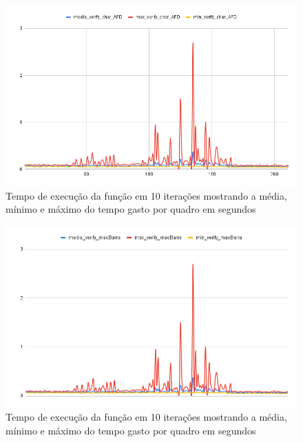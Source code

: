 \begin{figure}[H]
	\centering
	\caption{Tempo de execução da função  em 10 iterações mostrando a média, mínimo e máximo do tempo gasto por quadro em segundos}
	\includegraphics[scale=0.55]{figuras/grafico/char_AFD.png}
\end{figure}



\begin{figure}[H]
	\centering
	\caption{Tempo de execução da função  em 10 iterações mostrando a média, mínimo e máximo do tempo gasto por quadro em segundos}
	\includegraphics[scale=0.45]{figuras/grafico/maoBarra.png}
\end{figure}


